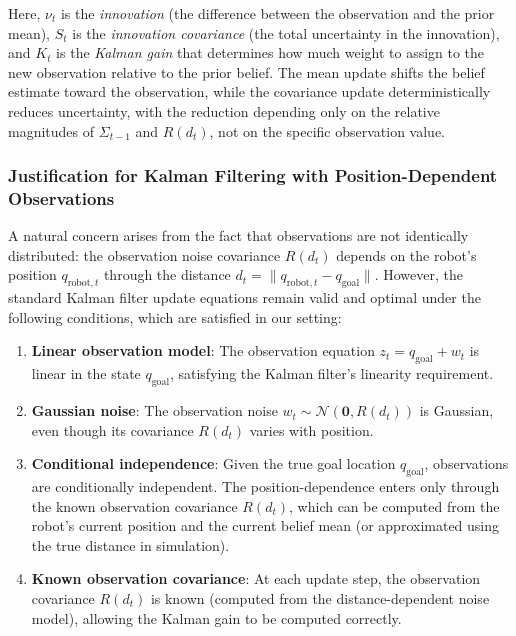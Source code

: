 Here, $\nu_t$ is the \emph{innovation} (the difference between the observation and the prior mean), $S_t$ is the \emph{innovation covariance} (the total uncertainty in the innovation), and $K_t$ is the \emph{Kalman gain} that determines how much weight to assign to the new observation relative to the prior belief. The mean update shifts the belief estimate toward the observation, while the covariance update deterministically reduces uncertainty, with the reduction depending only on the relative magnitudes of $\Sigma_{t-1}$ and $R(d_t)$, not on the specific observation value.

\subsubsection{Justification for Kalman Filtering with Position-Dependent Observations}

A natural concern arises from the fact that observations are not identically distributed: the observation noise covariance $R(d_t)$ depends on the robot's position $q_{\text{robot},t}$ through the distance $d_t = \|q_{\text{robot},t} - q_{\text{goal}}\|$. However, the standard Kalman filter update equations remain valid and optimal under the following conditions, which are satisfied in our setting:

\begin{enumerate}
    \item \textbf{Linear observation model}: The observation equation $z_t = q_{\text{goal}} + w_t$ is linear in the state $q_{\text{goal}}$, satisfying the Kalman filter's linearity requirement.
    
    \item \textbf{Gaussian noise}: The observation noise $w_t \sim \mathcal{N}(\mathbf{0}, R(d_t))$ is Gaussian, even though its covariance $R(d_t)$ varies with position.
    
    \item \textbf{Conditional independence}: Given the true goal location $q_{\text{goal}}$, observations are conditionally independent. The position-dependence enters only through the known observation covariance $R(d_t)$, which can be computed from the robot's current position and the current belief mean (or approximated using the true distance in simulation).
    
    \item \textbf{Known observation covariance}: At each update step, the observation covariance $R(d_t)$ is known (computed from the distance-dependent noise model), allowing the Kalman gain to be computed correctly.
\end{enumerate}

